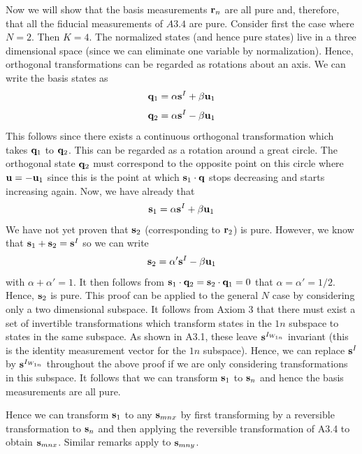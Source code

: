 \documentclass[10pt,twocolumn]{article}
\begin{document}
Now we will show that the basis measurements ${\bf r}_{n}$ are all
pure and, therefore, that all the fiducial measurements of $A3.4$ are
pure.  Consider first the case where $N=2$. Then $K=4$.  The normalized
states (and hence pure states) live in a three dimensional space (since
we can eliminate one variable by normalization).  Hence, orthogonal
transformations can be regarded as rotations about an axis.
We can write the basis
states as
\begin{equation}
{\bf q}_1=\alpha {\bf s}^I + \beta{\bf u}_1
\end{equation}
\begin{equation}
{\bf q}_2=\alpha {\bf s}^I - \beta{\bf u}_1
\end{equation}
This follows since there exists a continuous orthogonal
transformation which takes ${\bf q}_1$ to ${\bf q}_2$.  This can be
regarded as a rotation around a great circle.  The orthogonal state ${\bf
q}_2$ must correspond to the opposite point on this circle where ${\bf
u}=-{\bf u}_1$ since this is the point at which ${\bf s}_1\cdot {\bf q}$
stops decreasing and starts increasing again.
Now, we have already that
\begin{equation}
{\bf s}_1=\alpha {\bf s}^I + \beta{\bf u}_1
\end{equation}
We have not yet proven that ${\bf s}_2$ (corresponding to ${\bf
r}_{2}$) is pure. However, we know that ${\bf s}_1+{\bf s}_2={\bf s}^I$
so we can write
\begin{equation}
{\bf s}_2=\alpha' {\bf s}^I - \beta{\bf u}_1
\end{equation}
with $\alpha+\alpha'=1$.  It then follows from ${\bf s}_1\cdot{\bf q}_2=
{\bf s}_2\cdot{\bf q}_1=0$ that $\alpha=\alpha'=1/2$.  Hence, ${\bf
s}_2$ is pure.   This proof can be applied to the general $N$ case by
considering only a two dimensional subspace.  It follows from Axiom 3
that there must exist a set of invertible transformations which
transform states in the $1n$ subspace to states in the same subspace.
As shown in A3.1, these leave ${\bf s}^{I_{W_{1n}}}$ invariant (this is
the identity
measurement vector for the $1n$ subspace). Hence, we can replace ${\bf
s}^I$ by ${\bf s}^{I_{W_{1n}}}$ throughout the above proof if we are only
considering transformations in this subspace.  It follows that we can
transform ${\bf s}_1$ to ${\bf s}_n$ and hence the basis measurements
are all pure.

Hence we can transform ${\bf s}_1$ to any ${\bf s}_{mnx}$ by first
transforming by a reversible transformation to ${\bf s}_n$ and then
applying the reversible transformation of A3.4 to obtain ${\bf
s}_{mnx}$. Similar remarks apply to ${\bf s}_{mny}$.
\end{document}

